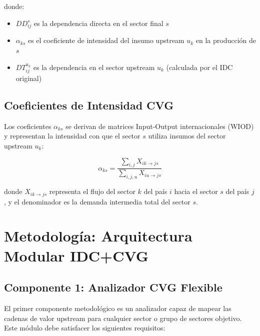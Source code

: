 \documentclass[12pt,a4paper]{article}
\begin{document}
donde:
\begin{itemize}
    \item $DD_{ij}^s$ es la dependencia directa en el sector final $s$
    \item $\alpha_{ks}$ es el coeficiente de intensidad del insumo upstream $u_k$ en la producción de $s$
    \item $DT_{ij}^{u_k}$ es la dependencia en el sector upstream $u_k$ (calculada por el IDC original)
\end{itemize}

\subsection{Coeficientes de Intensidad CVG}

Los coeficientes $\alpha_{ks}$ se derivan de matrices Input-Output internacionales (WIOD) y representan la intensidad con que el sector $s$ utiliza insumos del sector upstream $u_k$:

\begin{equation}
\alpha_{ks} = \frac{\sum_{i,j} X_{ik \rightarrow js}}{\sum_{i,j,u} X_{iu \rightarrow js}}
\end{equation}

donde $X_{ik \rightarrow js}$ representa el flujo del sector $k$ del país $i$ hacia el sector $s$ del país $j$, y el denominador es la demanda intermedia total del sector $s$.

\section{Metodología: Arquitectura Modular IDC+CVG}

\subsection{Componente 1: Analizador CVG Flexible}

El primer componente metodológico es un analizador capaz de mapear las cadenas de valor upstream para cualquier sector o grupo de sectores objetivo. Este módulo debe satisfacer los siguientes requisitos:
\end{document}
